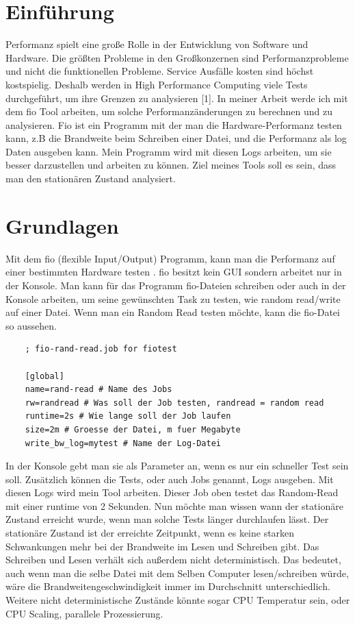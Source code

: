 \documentclass{article}
\begin{document}
\tableofcontents{}


\newpage
\section{Einführung}
Performanz spielt eine große Rolle in der Entwicklung von Software und Hardware.
Die größten Probleme in den Großkonzernen sind Performanzprobleme und nicht die funktionellen Probleme. Service Ausfälle kosten sind höchst kostspielig. 
Deshalb werden in High Performance Computing viele Tests durchgeführt, um ihre Grenzen zu analysieren [1].
In meiner Arbeit werde ich mit dem fio Tool arbeiten, um solche Performanzänderungen zu berechnen und zu analysieren.
Fio ist ein Programm mit der man die Hardware-Performanz testen kann, z.B die Brandweite beim Schreiben einer Datei, und die Performanz als log Daten ausgeben kann.
Mein Programm wird mit diesen Logs arbeiten, um sie besser darzustellen und arbeiten zu können. Ziel meines Tools soll es sein, dass man den stationären Zustand analysiert.


\section{Grundlagen}
Mit dem fio (flexible Input/Output) Programm, kann man die Performanz auf einer bestimmten Hardware testen .
fio besitzt kein GUI sondern arbeitet nur in der Konsole. Man kann für das Programm fio-Dateien schreiben oder auch in der Konsole arbeiten, um seine gewünschten Task zu testen,
wie random read/write auf einer Datei.
Wenn man ein Random Read testen möchte, kann die fio-Datei so aussehen.

\begin{lstlisting}
    ; fio-rand-read.job for fiotest

    [global]
    name=rand-read # Name des Jobs
    rw=randread # Was soll der Job testen, randread = random read
    runtime=2s # Wie lange soll der Job laufen
    size=2m # Groesse der Datei, m fuer Megabyte
    write_bw_log=mytest # Name der Log-Datei

\end{lstlisting}
In der Konsole gebt man sie als Parameter an, wenn es nur ein schneller Test sein soll. Zusätzlich können die Tests, 
oder auch Jobs genannt, Logs ausgeben. Mit diesen Logs wird mein Tool arbeiten. Dieser Job oben testet das Random-Read mit einer
runtime von 2 Sekunden. Nun möchte man wissen wann der stationäre Zustand erreicht wurde, wenn man solche Tests länger durchlaufen lässt.
Der stationäre Zustand ist der erreichte Zeitpunkt, wenn es keine starken Schwankungen mehr bei der Brandweite im Lesen und Schreiben gibt.
Das Schreiben und Lesen verhält sich außerdem nicht deterministisch. Das bedeutet, auch wenn man die selbe Datei mit dem Selben Computer lesen/schreiben
würde, wäre die Brandweitengeschwindigkeit immer im Durchschnitt unterschiedlich. Weitere nicht deterministische Zustände könnte sogar CPU Temperatur sein,
oder CPU Scaling, parallele Prozessierung. 
\end{document}
